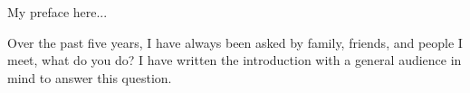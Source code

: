 My preface here...

Over the past five years, I have always been asked by family, friends, 
and people I meet, what do you do?
I have written the introduction with a general audience in mind to answer this
question.
